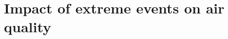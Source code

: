 \chapter{Impact of extreme events on air quality} \label{chap3}
\renewcommand{\headrulewidth}{0pt}
\lhead[\thepage]{\rightmark}
\rhead[\rightmark]{\thepage}
\cfoot[]{}


